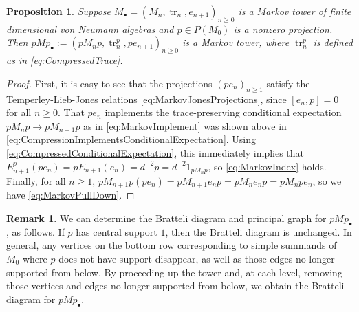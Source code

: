 \documentclass[11pt]{article}
\theoremstyle{plain}
\newtheorem{prop}[thm]{Proposition}
\theoremstyle{definition}
\newtheorem{remark}[thm]{Remark}
\DeclareMathOperator{\tr}{tr}
\begin{document}
\begin{prop}
Suppose $M_\bullet = (M_n,\tr_n, e_{n+1})_{n\geq0}$ is a Markov tower of finite dimensional von Neumann algebras and $p\in P(M_0)$ is a nonzero projection.
Then $pMp_\bullet:= (pM_np, \tr_n^p, pe_{n+1})_{n\geq0}$ is a Markov tower, where $\tr_n^p$ is defined as in \eqref{eq:CompressedTrace}.
\end{prop}
\begin{proof}
First, it is easy to see that the projections $(pe_n)_{n\geq 1}$ satisfy the Temperley-Lieb-Jones relations \ref{eq:MarkovJonesProjections}, since $[e_n,p]=0$ for all $n\geq 0$.
That $pe_n$ implements the trace-preserving conditional expectation $pM_np \to pM_{n-1}p$ as in \ref{eq:MarkovImplement} was shown above in \eqref{eq:CompressionImplementsConditionalExpectation}.
Using \eqref{eq:CompressedConditionalExpectation}, this immediately implies that $E_{n+1}^p(pe_n) = pE_{n+1}(e_n) = d^{-2}p = d^{-2} 1_{pM_np}$, so \ref{eq:MarkovIndex} holds.
Finally, for all $n\geq 1$, $pM_{n+1}p (pe_n) = pM_{n+1}e_np = pM_ne_np = pM_npe_n$, so we have \ref{eq:MarkovPullDown}.
\end{proof}

\begin{remark}
 \label{Rem:CompressionTowerEffects}
We can determine the Bratteli diagram and principal graph for $pMp_\bullet$, as follows. 
If $p$ has central support $1$, then the Bratteli diagram is unchanged. 
In general, any vertices on the bottom row corresponding to simple summands of $M_0$ where $p$ does not have support disappear, as well as those edges no longer supported from below. 
By proceeding up the tower and, at each level, removing those vertices and edges no longer supported from below, we obtain the Bratteli diagram for $pMp_\bullet$.
\end{remark}
\end{document}
